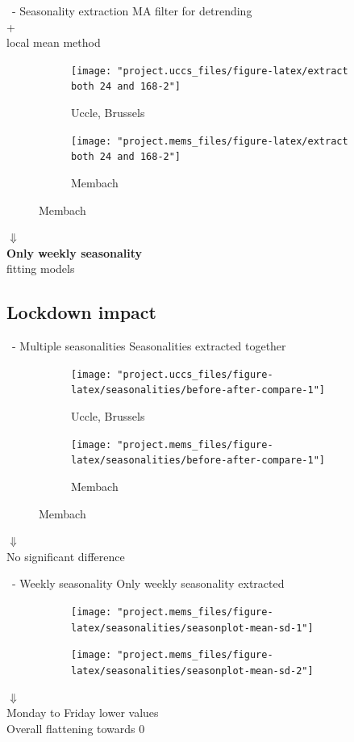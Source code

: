 \documentclass{beamer}
\begin{document}
\begin{frame}{\subsecname~- Seasonality extraction}
	\centering MA filter for detrending\\+\\local mean method%
	\begin{figure}
		\begin{subfigure}{.45\linewidth}
			\texttt{[image: "project.uccs\_files/figure-latex/extract both 24 and 168-2"]}
			\caption{Uccle, Brussels}
		\end{subfigure}
		\begin{subfigure}{.45\linewidth}
			\texttt{[image: "project.mems\_files/figure-latex/extract both 24 and 168-2"]}
			\caption{Membach}
		\end{subfigure}
	\end{figure}
	\large$\Downarrow$\\
	\normalsize\textbf{Only weekly seasonality}\\\small fitting models
\end{frame}

\subsection{Lockdown impact}
\begin{frame}{\subsecname~- Multiple seasonalities}\centering
	Seasonalities extracted together
	\begin{figure}
		\begin{subfigure}{.45\linewidth}
			\texttt{[image: "project.uccs\_files/figure-latex/seasonalities/before-after-compare-1"]}
			\caption{Uccle, Brussels}
		\end{subfigure}
		\begin{subfigure}{.45\linewidth}
			\texttt{[image: "project.mems\_files/figure-latex/seasonalities/before-after-compare-1"]}
			\caption{Membach}
		\end{subfigure}
	\end{figure}
	\large$\Downarrow$\\
	\normalsize No significant difference
\end{frame}

\begin{frame}{\subsecname~- Weekly seasonality}\centering
	Only weekly seasonality extracted
	\begin{figure}
		\begin{subfigure}{.45\linewidth}
			\texttt{[image: "project.mems\_files/figure-latex/seasonalities/seasonplot-mean-sd-1"]}
		\end{subfigure}
		\begin{subfigure}{.45\linewidth}
			\texttt{[image: "project.mems\_files/figure-latex/seasonalities/seasonplot-mean-sd-2"]}
		\end{subfigure}
	\end{figure}
	\large$\Downarrow$\\
	\vspace{.3em}\normalsize Monday to Friday lower values\\
	\vspace{.3em}Overall flattening towards 0
\end{frame}
	
\end{document}
